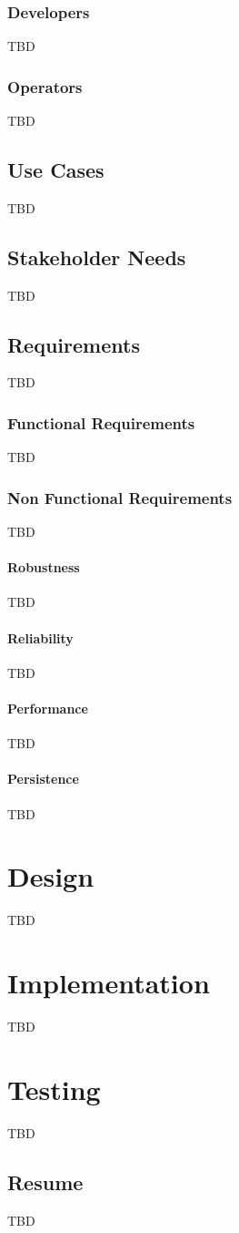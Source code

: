 \documentclass[a4paper,12pt]{book}
\begin{document}
\section{Developers}
TBD

\section{Operators}
TBD

\chapter{Use Cases}
TBD

\chapter{Stakeholder Needs}
TBD

\chapter{Requirements}
TBD

\section{Functional Requirements}
TBD

\section{Non Functional Requirements}
TBD

\subsection{Robustness}
TBD

\subsection{Reliability}
TBD

\subsection{Performance}
TBD

\subsection{Persistence}
TBD

\part{Design}
TBD

\part{Implementation}
TBD

\part{Testing}
TBD

\chapter{Resume}
TBD
\end{document}

